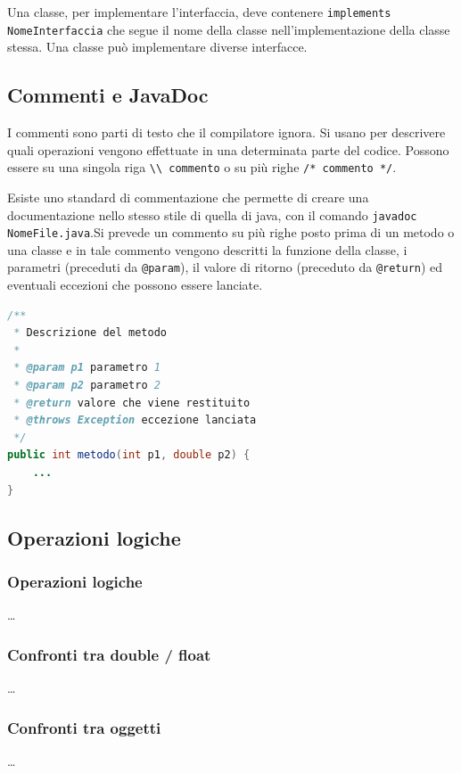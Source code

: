 \documentclass{article}
\begin{document}
Una classe, per implementare l'interfaccia, deve contenere \verb|implements NomeInterfaccia| che segue il nome della
classe nell'implementazione della classe stessa. Una classe può implementare diverse interfacce.

\subsection{Commenti e JavaDoc}
I commenti sono parti di testo che il compilatore ignora. Si usano per descrivere quali operazioni vengono effettuate
in una determinata parte del codice. Possono essere su una singola riga \verb|\\ commento| o su più righe \verb|/* commento */|.

Esiste uno standard di commentazione che permette di creare una documentazione nello stesso stile di quella di java,
con il  comando \verb|javadoc NomeFile.java|.Si prevede un commento su più righe posto prima di un metodo o una classe
e in tale commento vengono descritti la funzione della classe, i parametri (preceduti da \verb|@param|), il valore di
ritorno (preceduto da \verb|@return|) ed eventuali eccezioni che possono essere lanciate.

\begin{lstlisting}[language=Java]
/**
 * Descrizione del metodo
 * 
 * @param p1 parametro 1
 * @param p2 parametro 2
 * @return valore che viene restituito
 * @throws Exception eccezione lanciata
 */
public int metodo(int p1, double p2) {
	...
}
\end{lstlisting}

\newpage


\subsection{Operazioni logiche}
\subsubsection*{Operazioni logiche}
\dots

\subsubsection*{Confronti tra double / float}
\dots

\subsubsection*{Confronti tra oggetti}
\dots
\end{document}
